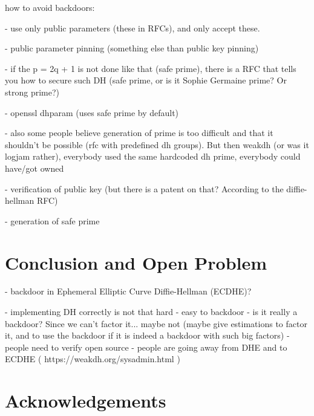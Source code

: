 \documentclass[a4paper,11pt,twocolumn]{article}
\begin{document}
how to avoid backdoors:

- use only public parameters (these in RFCs), and only accept these. 

- public parameter pinning (something else than public key pinning)

- if the p = 2q + 1 is not done like that (safe prime), there is a RFC that tells you how to secure such DH (safe prime, or is it Sophie Germaine prime? Or strong prime?)

- openssl dhparam (uses safe prime by default)

- also some people believe generation of prime is too difficult and that it shouldn't be possible (rfc with predefined dh groups). But then weakdh (or was it logjam rather), everybody used the same hardcoded dh prime, everybody could have/got owned

- verification of public key (but there is a patent on that? According to the diffie-hellman RFC)

- generation of safe prime


\section{Conclusion and Open Problem}

- backdoor in Ephemeral Elliptic Curve Diffie-Hellman (ECDHE)?

- implementing DH correctly is not that hard
- easy to backdoor
- is it really a backdoor? Since we can't factor it... maybe not (maybe give estimations to factor it, and to use the backdoor if it is indeed a backdoor with such big factors)
- people need to verify open source
- people are going away from DHE and to ECDHE ( https://weakdh.org/sysadmin.html )
\newpage

\section*{Acknowledgements}


\newpage
\end{document}
